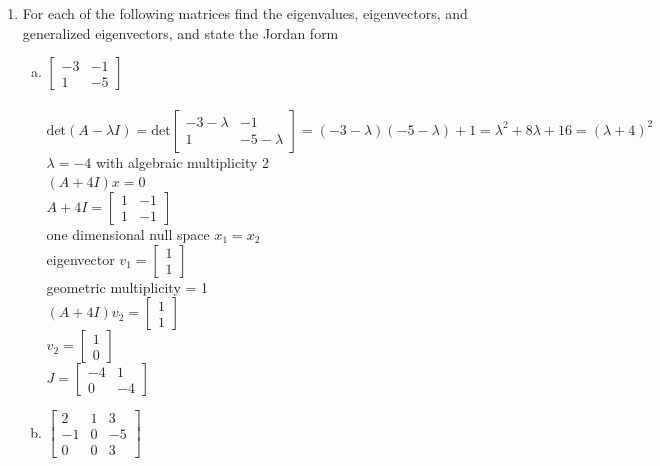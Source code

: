 \documentclass{article}
\begin{document}
{{\begin{enumerate}
\newpage\item For each of the following matrices find the eigenvalues, eigenvectors, and generalized eigenvectors, and state the Jordan form
\begin{enumerate}[a.]
\item $\left[\begin{array}{cc}
-3 & -1\\
1 & -5
\end{array}\right]$
\\
\\$\textrm{det}(A-\lambda I)=\textrm{det}\left[\begin{array}{cc} -3-\lambda & -1 \\ 1 & -5-\lambda \end{array}\right]=(-3-\lambda)(-5-\lambda)+1=\lambda^2+8\lambda+16=(\lambda+4)^2$
\\$\lambda=-4$ with algebraic multiplicity 2
\\$(A+4I)x=0$
\\$A+4I=\left[\begin{array}{cc} 1 & -1 \\ 1 & -1 \end{array}\right]$
\\one dimensional null space $x_1=x_2$
\\eigenvector $v_1=\left[\begin{array}{c} 1 \\ 1 \end{array}\right]$
\\geometric multiplicity = 1
\\$(A+4I)v_2=\left[\begin{array}{c} 1 \\ 1 \end{array}\right]$
\\$v_2=\left[\begin{array}{c} 1 \\ 0 \end{array}\right]$
\\$J=\left[\begin{array}{cc} -4 & 1 \\ 0 & -4 \end{array}\right]$
\\
\item $\left[\begin{array}{ccc}
2 & 1 & 3\\
-1 & 0 & -5\\
0 & 0 & 3
\end{array}\right]$
\\

\end{enumerate}
\end{enumerate}}}
\end{document}
